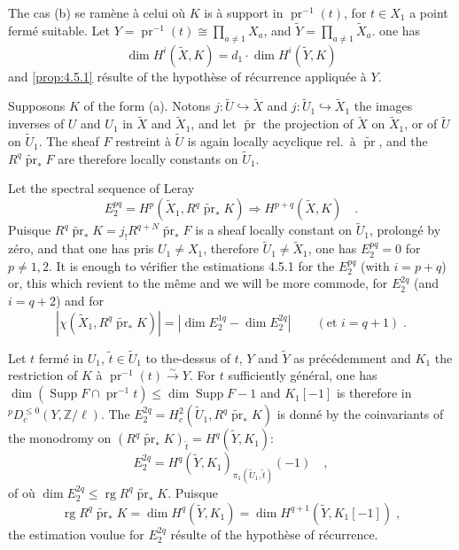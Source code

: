 \documentclass[12pt,a4paper]{article}
\theoremstyle{plain}
\theoremstyle{definition}
\DeclareMathOperator{\Supp}{Supp}
\DeclareMathOperator{\rg}{rg}
\newcommand{\into}{\hookrightarrow}
\newcommand{\isom}{\xrightarrow{\sim}}
\providecommand{\pr}{\operatorname{pr}}
\begin{document}
{{The cas (b) se ram\`{e}ne \`{a} celui o\`{u} $K$ is \`{a} support in $\pr^{-1}(t)$, for $t \in X_{1}$ a point ferm\'{e} suitable. Let $Y = \pr^{-1}(t) \cong \prod_{a \neq 1} X_{a}$, and $\tilde{Y} = \prod_{a \neq 1} \tilde{X}_{a}$. one has
\[
\dim H^{i}(\tilde{X}, K) = d_{1} \cdot \dim H^{i}(\tilde{Y}, K)
\]
and \ref{prop:4.5.1} r\'{e}sulte of the hypoth\`{e}se of r\'{e}currence appliqu\'{e}e \`{a} $Y$.

Supposons $K$ of the form (a). Notons $j: \tilde{U} \into \tilde{X}$ and $j: \tilde{U}_{1} \into \tilde{X}_{1}$ the images inverses of $U$ and $U_{1}$ in $\tilde{X}$ and $\tilde{X}_{1}$, and let $\tilde{\pr}$ the projection of $\tilde{X}$ on $\tilde{X}_{1}$, or of $\tilde{U}$ on $\tilde{U}_{1}$. The sheaf $F$ restreint \`{a} $\tilde{U}$ is again locally acyclique rel.\ \`{a} $\tilde{\pr}$, and the $R^{q}\tilde{\pr}_{*}F$ are therefore locally constants on $\tilde{U}_{1}$.

Let the spectral sequence of Leray
\[
E_{2}^{pq} = H^{p}(\tilde{X}_{1}, R^{q}\tilde{\pr}_{*}K) \Rightarrow H^{p+q}(\tilde{X}, K)\quad.
\]
Puisque $R^{q}\tilde{\pr}_{*}K = j_{!}R^{q+N}\tilde{\pr}_{*}F$ is a sheaf locally constant on $\tilde{U}_{1}$, prolong\'{e} by z\'{e}ro, and that one has pris $U_{1} \neq X_{1}$, therefore $\tilde{U}_{1} \neq \tilde{X}_{1}$, one has $E_{2}^{pq} = 0$ for $p \neq 1, 2$. It is enough to v\'{e}rifier the estimations 4.5.1 for the $E_{2}^{pq}$ (with $i = p+q$) or, this which revient to the m\^{e}me and we will be more commode, for $E_{2}^{2q}$ (and $i = q+2$) and for
\[
|\chi(\tilde{X}_{1}, R^{q}\tilde{\pr}_{*}K)| = |\dim E_{2}^{1q} - \dim E_{2}^{2q}| \qquad (\text{et } i = q+1)\;.
\]

Let $t$ ferm\'{e} in $U_{1}$, $\tilde{t} \in \tilde{U}_{1}$ to the-dessus of $t$, $Y$ and $\tilde{Y}$ as pr\'{e}c\'{e}demment and $K_{1}$ the restriction of $K$ \`{a} $\pr^{-1}(t) \isom Y$. For $t$ sufficiently g\'{e}n\'{e}ral, one has $\dim(\Supp F \cap \pr^{-1}t) \leq \dim \Supp F - 1$ and $K_{1}[-1]$ is therefore in ${}^{p}D_{c}^{\leq 0}(Y, \mathbb{Z}/\ell)$. The $E_{2}^{2q} = H_{c}^{2}(\tilde{U}_{1}, R^{q}\tilde{\pr}_{*}K)$ is donn\'{e} by the coinvariants of the monodromy on $(R^{q}\tilde{\pr}_{*}K)_{\tilde{t}} = H^{q}(\tilde{Y}, K_{1})$:
\[
E_{2}^{2q} = H^{q}(\tilde{Y}, K_{1})_{\pi_{1}(\tilde{U}_{1}, \tilde{t})}(-1)\quad,
\]
of o\`{u} $\dim E_{2}^{2q} \leq \rg R^{q}\tilde{\pr}_{*}K$. Puisque
\begin{equation}\label{eq:4.5.1.1}
\rg R^{q}\tilde{\pr}_{*}K = \dim H^{q}(\tilde{Y}, K_{1}) = \dim H^{q+1}(\tilde{Y}, K_{1}[-1])\;,
\end{equation}
the estimation voulue for $E_{2}^{2q}$ r\'{e}sulte of the hypoth\`{e}se of r\'{e}currence.

}}
\end{document}
